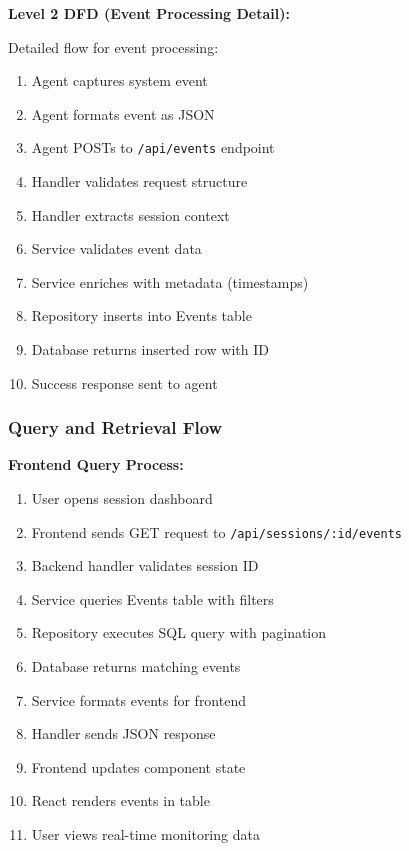 \textbf{Level 2 DFD (Event Processing Detail):}

Detailed flow for event processing:

\begin{enumerate}
    \item Agent captures system event
    \item Agent formats event as JSON
    \item Agent POSTs to \texttt{/api/events} endpoint
    \item Handler validates request structure
    \item Handler extracts session context
    \item Service validates event data
    \item Service enriches with metadata (timestamps)
    \item Repository inserts into Events table
    \item Database returns inserted row with ID
    \item Success response sent to agent
\end{enumerate}

\subsubsection{Query and Retrieval Flow}

\textbf{Frontend Query Process:}

\begin{enumerate}
    \item User opens session dashboard
    \item Frontend sends GET request to \texttt{/api/sessions/:id/events}
    \item Backend handler validates session ID
    \item Service queries Events table with filters
    \item Repository executes SQL query with pagination
    \item Database returns matching events
    \item Service formats events for frontend
    \item Handler sends JSON response
    \item Frontend updates component state
    \item React renders events in table
    \item User views real-time monitoring data
\end{enumerate}


